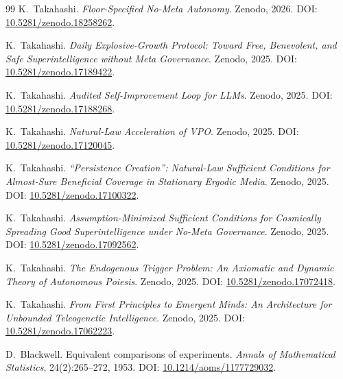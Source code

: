 \documentclass[11pt,a4paper]{article}
\theoremstyle{definition}
\theoremstyle{remark}
\begin{document}
\begin{thebibliography}{99}
K.~Takahashi.
\newblock \emph{Floor-Specified No-Meta Autonomy}.
\newblock Zenodo, 2026.
\newblock DOI: \href{https://doi.org/10.5281/zenodo.18258262}{10.5281/zenodo.18258262}.

K.~Takahashi.
\newblock \emph{Daily Explosive-Growth Protocol: Toward Free, Benevolent, and Safe Superintelligence without Meta Governance}.
\newblock Zenodo, 2025.
\newblock DOI: \href{https://doi.org/10.5281/zenodo.17189422}{10.5281/zenodo.17189422}.

K.~Takahashi.
\newblock \emph{Audited Self-Improvement Loop for LLMs}.
\newblock Zenodo, 2025.
\newblock DOI: \href{https://doi.org/10.5281/zenodo.17188268}{10.5281/zenodo.17188268}.

K.~Takahashi.
\newblock \emph{Natural-Law Acceleration of VPO}.
\newblock Zenodo, 2025.
\newblock DOI: \href{https://doi.org/10.5281/zenodo.17120045}{10.5281/zenodo.17120045}.

K.~Takahashi.
\newblock \emph{``Persistence Creation'': Natural-Law Sufficient Conditions for Almost-Sure Beneficial Coverage in Stationary Ergodic Media}.
\newblock Zenodo, 2025.
\newblock DOI: \href{https://doi.org/10.5281/zenodo.17100322}{10.5281/zenodo.17100322}.

K.~Takahashi.
\newblock \emph{Assumption-Minimized Sufficient Conditions for Cosmically Spreading Good Superintelligence under No-Meta Governance}.
\newblock Zenodo, 2025.
\newblock DOI: \href{https://doi.org/10.5281/zenodo.17092562}{10.5281/zenodo.17092562}.

K.~Takahashi.
\newblock \emph{The Endogenous Trigger Problem: An Axiomatic and Dynamic Theory of Autonomous Poiesis}.
\newblock Zenodo, 2025.
\newblock DOI: \href{https://doi.org/10.5281/zenodo.17072418}{10.5281/zenodo.17072418}.

K.~Takahashi.
\newblock \emph{From First Principles to Emergent Minds: An Architecture for Unbounded Teleogenetic Intelligence}.
\newblock Zenodo, 2025.
\newblock DOI: \href{https://doi.org/10.5281/zenodo.17062223}{10.5281/zenodo.17062223}.

D.~Blackwell.
\newblock Equivalent comparisons of experiments.
\newblock \emph{Annals of Mathematical Statistics}, 24(2):265--272, 1953.
\newblock DOI: \href{https://doi.org/10.1214/aoms/1177729032}{10.1214/aoms/1177729032}.


\end{thebibliography}
\end{document}
